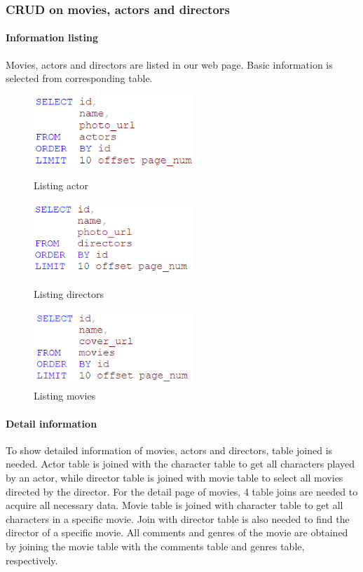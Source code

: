 \begin{CJK*}{UTF8}{gbsn}
\subsubsection{CRUD on movies, actors and directors}
\paragraph{Information listing}Movies, actors and directors are listed in our web page. Basic information is selected from corresponding table.
\begin{figure}[htbp]
\centering
\label{list}
\begin{minipage}[t]{0.3\textwidth}
\centering
\includegraphics[width=6cm]{a_list.png}
\caption{Listing actor}
\end{minipage}
\begin{minipage}[t]{0.3\textwidth}
\centering
\includegraphics[width=6cm]{dir_list.png}
\caption{Listing directors}
\end{minipage}



\begin{minipage}[t]{0.45\textwidth}
\centering
\includegraphics[width=6cm]{m_list.png}
\caption{Listing movies}
\end{minipage}
\end{figure}




\paragraph{Detail information} To show detailed information of movies, actors and directors, table joined is needed. Actor table is joined with the character table to get all characters played by an actor, while director table is joined with movie table to select all movies directed by the director. For the detail page of movies, 4 table joins are needed to acquire all necessary data. Movie table is joined with character table to get all characters in a specific movie. Join with director table is also needed to find the director of a specific movie. All comments and genres of the movie are obtained by joining the movie table with the comments table and genres table, respectively.
 



\end{CJK*}
